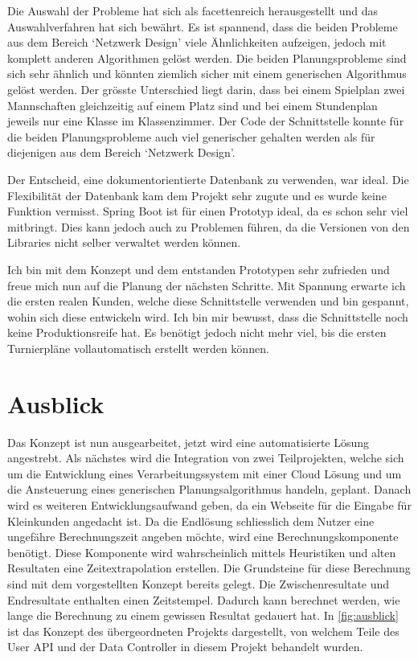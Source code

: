 Die Auswahl der Probleme hat sich als facettenreich herausgestellt und das Auswahlverfahren hat sich bewährt. Es ist spannend, dass die beiden Probleme aus dem Bereich `Netzwerk Design' 
viele Ähnlichkeiten aufzeigen, jedoch mit komplett anderen Algorithmen gelöst werden. Die beiden Planungsprobleme sind sich sehr ähnlich und könnten ziemlich sicher mit einem generischen 
Algorithmus gelöst werden. Der grösste Unterschied liegt darin, dass bei einem Spielplan zwei Mannschaften gleichzeitig auf einem Platz sind und bei einem 
Stundenplan jeweils nur eine Klasse im Klassenzimmer. Der Code der Schnittstelle konnte für die beiden Planungsprobleme auch viel generischer gehalten werden als für diejenigen aus dem Bereich 
`Netzwerk Design'.

Der Entscheid, eine dokumentorientierte Datenbank zu verwenden, war ideal. Die Flexibilität der Datenbank kam dem Projekt sehr zugute und es wurde keine Funktion vermisst. Spring Boot ist für 
einen Prototyp ideal, da es schon sehr viel mitbringt. Dies kann jedoch auch zu Problemen führen, da die Versionen von den Libraries nicht selber verwaltet werden können. 

Ich bin mit dem Konzept und dem entstanden Prototypen sehr zufrieden und freue mich nun auf die Planung der nächsten Schritte. Mit Spannung erwarte ich die ersten realen Kunden, welche diese 
Schnittstelle verwenden und bin gespannt, wohin sich diese entwickeln wird. Ich bin mir bewusst, dass die Schnittstelle noch keine Produktionsreife hat. Es benötigt jedoch nicht mehr viel, bis die ersten 
Turnierpläne vollautomatisch erstellt werden können.

\section{Ausblick}\label{fazit_ausblick}

Das Konzept ist nun ausgearbeitet, jetzt wird eine automatisierte Lösung angestrebt. Als nächstes wird die Integration von zwei Teilprojekten, welche sich um die Entwicklung eines 
Verarbeitungssystem mit einer Cloud Lösung und um die Ansteuerung eines generischen Planungsalgorithmus handeln, geplant. Danach wird es weiteren Entwicklungsaufwand geben, da ein 
Webseite für die Eingabe für Kleinkunden angedacht ist. Da die Endlösung schliesslich dem Nutzer eine ungefähre Berechnungszeit angeben möchte, wird eine Berechnungskomponente 
benötigt. Diese Komponente wird wahrscheinlich mittels Heuristiken und alten Resultaten eine Zeitextrapolation erstellen. Die Grundsteine für diese Berechnung sind mit dem vorgestellten Konzept 
bereits gelegt. Die Zwischenresultate und Endresultate enthalten einen Zeitstempel. Dadurch kann berechnet werden, wie lange die Berechnung zu einem gewissen Resultat gedauert hat. In 
\autoref{fig:ausblick} ist das Konzept des übergeordneten Projekts dargestellt, von welchem Teile des User API und der Data Controller in diesem Projekt behandelt wurden.


